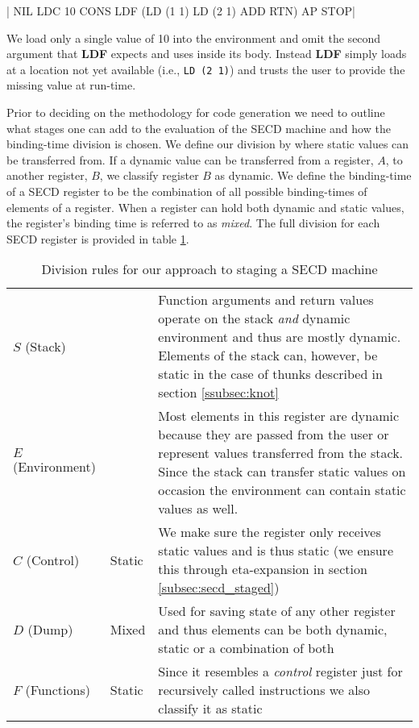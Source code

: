 \documentclass[a4paper,12pt,twoside,openright]{report}
\theoremstyle{definition}
\begin{document}
|   NIL LDC 10 CONS LDF (LD (1 1) LD (2 1) ADD RTN) AP STOP|

We load only a single value of 10 into the environment and omit the second argument that \textbf{LDF} expects and uses inside its body. Instead \textbf{LDF} simply loads at a location not yet available (i.e., \mbox{\texttt{LD (2 1)}}) and trusts the user to provide the missing value at run-time.

Prior to deciding on the methodology for code generation we need to outline what stages one can add to the evaluation of the SECD machine and how the binding-time division is chosen. We define our division by where static values can be transferred from. If a dynamic value can be transferred from a register, $A$, to another register, $B$, we classify register $B$ as dynamic. We define the binding-time of a SECD register to be the combination of all possible binding-times of elements of a register. When a register can hold both dynamic and static values, the register's binding time is referred to as \textit{mixed}. The full division for each SECD register is provided in table \ref{tbl:secd_division}.

\begin{table}[!htbp]
  \centering
  \begin{tabular}{|p{3cm}|p{3cm}|p{6cm}|}
 	\hline
 	\thead{SECD Register}	&	\thead{Classification}	&	\thead{Reason}	\\ \hline
	$S$ (Stack)				&	\vtop{\hbox{\strut Mixed}\hbox{\strut (mostly dynamic)}}				&	Function arguments and return values operate on the stack \textit{and} dynamic environment and thus are mostly dynamic. Elements of the stack can, however, be static in the case of thunks described in section \ref{ssubsec:knot} \\ \hline

	$E$ (Environment)		&	\vtop{\hbox{\strut Mixed}\hbox{\strut (mostly dynamic)}}	&	 Most elements in this register are dynamic because they are passed from the user or represent values transferred from the stack. Since the stack can transfer static values on occasion the environment can contain static values as well. \\ \hline

	$C$ (Control)				&	Static				& We make sure the register only receives static values and is thus static (we ensure this through eta-expansion in section \ref{subsec:secd_staged})  \\ \hline

	$D$ (Dump)				&	Mixed				&	Used for saving state of any other register and thus elements can be both dynamic, static or a combination of both \\ \hline

	$F$ (Functions)		&	Static				&	Since it resembles a \textit{control} register just for recursively called instructions we also classify it as static \\

	\hline
  \end{tabular}
  \caption{Division rules for our approach to staging a SECD machine}
  \label{tbl:secd_division}
\end{table}
\end{document}
